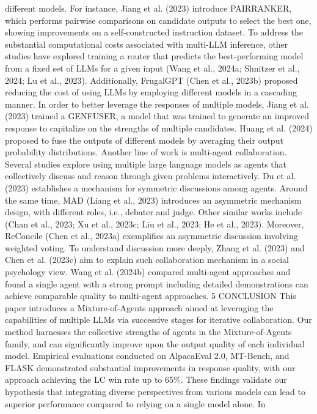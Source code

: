 different models. For instance, Jiang et al. (2023) introduce PAIRRANKER, which performs pairwise
comparisons on candidate outputs to select the best one, showing improvements on a self-constructed
instruction dataset. To address the substantial computational costs associated with multi-LLM
inference, other studies have explored training a router that predicts the best-performing model
from a fixed set of LLMs for a given input (Wang et al., 2024a; Shnitzer et al., 2024; Lu et al.,
2023). Additionally, FrugalGPT (Chen et al., 2023b) proposed reducing the cost of using LLMs
by employing different models in a cascading manner. In order to better leverage the responses of
multiple models, Jiang et al. (2023) trained a GENFUSER, a model that was trained to generate an
improved response to capitalize on the strengths of multiple candidates. Huang et al. (2024) proposed
to fuse the outputs of different models by averaging their output probability distributions.
Another line of work is multi-agent collaboration. Several studies explore using multiple large
language models as agents that collectively discuss and reason through given problems interactively.
Du et al. (2023) establishes a mechanism for symmetric discussions among agents. Around the same
time, MAD (Liang et al., 2023) introduces an asymmetric mechanism design, with different roles, i.e.,
debater and judge. Other similar works include (Chan et al., 2023; Xu et al., 2023c; Liu et al., 2023;
He et al., 2023). Moreover, ReConcile (Chen et al., 2023a) exemplifies an asymmetric discussion
involving weighted voting. To understand discussion more deeply, Zhang et al. (2023) and Chen
et al. (2023c) aim to explain such collaboration mechanism in a social psychology view. Wang et al.
(2024b) compared multi-agent approaches and found a single agent with a strong prompt including
detailed demonstrations can achieve comparable quality to multi-agent approaches.
5
CONCLUSION
This paper introduces a Mixture-of-Agents approach aimed at leveraging the capabilities of multiple
LLMs via successive stages for iterative collaboration. Our method harnesses the collective strengths
of agents in the Mixture-of-Agents family, and can significantly improve upon the output quality of
each individual model. Empirical evaluations conducted on AlpacaEval 2.0, MT-Bench, and FLASK
demonstrated substantial improvements in response quality, with our approach achieving the LC win
rate up to 65\%. These findings validate our hypothesis that integrating diverse perspectives from
various models can lead to superior performance compared to relying on a single model alone. In
